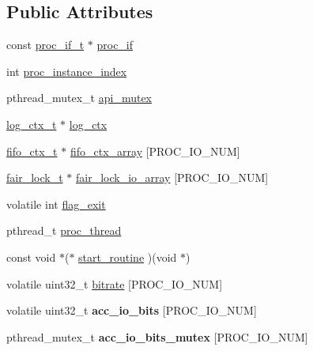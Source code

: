 \subsection*{Public Attributes}
\begin{DoxyCompactItemize}
\item 
const \hyperlink{proc_8h_a679816cf30e0b7a8f3e7464e67a6a844}{proc\+\_\+if\+\_\+t} $\ast$ \hyperlink{structproc__ctx__s_ae63f720fef21f807ed42fe76806140f6}{proc\+\_\+if}
\item 
int \hyperlink{structproc__ctx__s_a3912d4b5eaffcdaefa00f149ca4a8c63}{proc\+\_\+instance\+\_\+index}
\item 
pthread\+\_\+mutex\+\_\+t \hyperlink{structproc__ctx__s_aea90c57d9b0a303b638a51ce7efa9a1e}{api\+\_\+mutex}
\item 
\hyperlink{structlog__ctx__s}{log\+\_\+ctx\+\_\+t} $\ast$ \hyperlink{structproc__ctx__s_a7c58dee78b4d7834e4c2fe430cd267d5}{log\+\_\+ctx}
\item 
\hyperlink{structfifo__ctx__s}{fifo\+\_\+ctx\+\_\+t} $\ast$ \hyperlink{structproc__ctx__s_a3b71d039235f439a87d9ec7d7b5b5549}{fifo\+\_\+ctx\+\_\+array} \mbox{[}P\+R\+O\+C\+\_\+\+I\+O\+\_\+\+N\+UM\mbox{]}
\item 
\hyperlink{structfair__lock__s}{fair\+\_\+lock\+\_\+t} $\ast$ \hyperlink{structproc__ctx__s_a6529e1ba97566c429d658e121bb604bb}{fair\+\_\+lock\+\_\+io\+\_\+array} \mbox{[}P\+R\+O\+C\+\_\+\+I\+O\+\_\+\+N\+UM\mbox{]}
\item 
volatile int \hyperlink{structproc__ctx__s_a86a21b28f6c41f7a9a4cc9586f782d68}{flag\+\_\+exit}
\item 
pthread\+\_\+t \hyperlink{structproc__ctx__s_a09ad60355584215cfeb4d5589ee390b9}{proc\+\_\+thread}
\item 
const void $\ast$($\ast$ \hyperlink{structproc__ctx__s_a1149ce1c28aae8e553c85125e30be661}{start\+\_\+routine} )(void $\ast$)
\end{DoxyCompactItemize}
{\bf }\par
\begin{DoxyCompactItemize}
\item 
volatile uint32\+\_\+t \hyperlink{structproc__ctx__s_a31bad437eed5d81c08a01538416c3639}{bitrate} \mbox{[}P\+R\+O\+C\+\_\+\+I\+O\+\_\+\+N\+UM\mbox{]}
\item 
volatile uint32\+\_\+t {\bfseries acc\+\_\+io\+\_\+bits} \mbox{[}P\+R\+O\+C\+\_\+\+I\+O\+\_\+\+N\+UM\mbox{]}\hypertarget{structproc__ctx__s_a63e59dc7c4a361ca2b52e2354f51c33a}{}\label{structproc__ctx__s_a63e59dc7c4a361ca2b52e2354f51c33a}

\item 
pthread\+\_\+mutex\+\_\+t {\bfseries acc\+\_\+io\+\_\+bits\+\_\+mutex} \mbox{[}P\+R\+O\+C\+\_\+\+I\+O\+\_\+\+N\+UM\mbox{]}\hypertarget{structproc__ctx__s_a486d5806453d8171e298c449c6391c1d}{}\label{structproc__ctx__s_a486d5806453d8171e298c449c6391c1d}

\end{DoxyCompactItemize}

